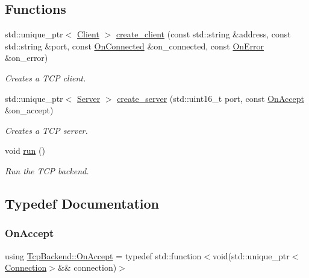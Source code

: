 \subsection*{Functions}
\begin{DoxyCompactItemize}
\item 
std\+::unique\+\_\+ptr$<$ \hyperlink{classTcpBackend_1_1Client}{Client} $>$ \hyperlink{namespaceTcpBackend_ac561d1ab714a1b76b3db75b205dd4f84}{create\+\_\+client} (const std\+::string \&address, const std\+::string \&port, const \hyperlink{namespaceTcpBackend_afa30fa9a706436148fb2857a2174e625}{On\+Connected} \&on\+\_\+connected, const \hyperlink{namespaceTcpBackend_a17e8f044749312a6692cd0135565cbc4}{On\+Error} \&on\+\_\+error)
\begin{DoxyCompactList}\small\item\em Creates a T\+CP client. \end{DoxyCompactList}\item 
std\+::unique\+\_\+ptr$<$ \hyperlink{classTcpBackend_1_1Server}{Server} $>$ \hyperlink{namespaceTcpBackend_ad25ce62084f2e8ec8e6bd07d7510b7f2}{create\+\_\+server} (std\+::uint16\+\_\+t port, const \hyperlink{namespaceTcpBackend_a8aed04c0b1d33eb06aec746da4452484}{On\+Accept} \&on\+\_\+accept)
\begin{DoxyCompactList}\small\item\em Creates a T\+CP server. \end{DoxyCompactList}\item 
void \hyperlink{namespaceTcpBackend_ad949ba412696b6c7484f981fcb36a705}{run} ()
\begin{DoxyCompactList}\small\item\em Run the T\+CP backend. \end{DoxyCompactList}\end{DoxyCompactItemize}


\subsection{Typedef Documentation}
\mbox{\label{namespaceTcpBackend_a8aed04c0b1d33eb06aec746da4452484}} 
\subsubsection{\texorpdfstring{On\+Accept}{OnAccept}}
{\footnotesize\ttfamily using \hyperlink{namespaceTcpBackend_a8aed04c0b1d33eb06aec746da4452484}{Tcp\+Backend\+::\+On\+Accept} = typedef std\+::function$<$void(std\+::unique\+\_\+ptr$<$\hyperlink{classTcpBackend_1_1Connection}{Connection}$>$\&\& connection)$>$}



